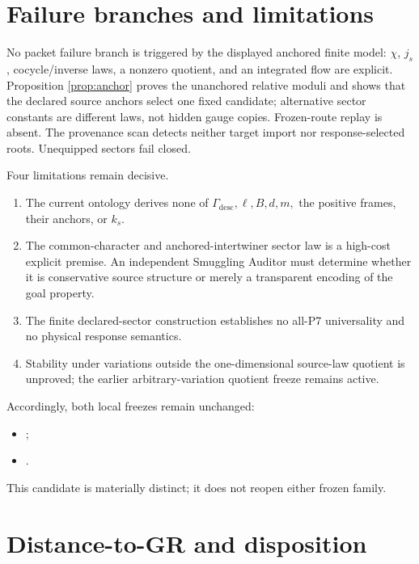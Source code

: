 \documentclass[11pt]{article}
\begin{document}
\section{Failure branches and limitations}

No packet failure branch is triggered by the displayed anchored finite model:
$\chi$, $j_s$, cocycle/inverse laws, a nonzero quotient, and an integrated flow
are explicit.  Proposition \ref{prop:anchor} proves the unanchored relative
moduli and shows that the declared source anchors select one fixed candidate;
alternative sector constants are different laws, not hidden gauge copies.
Frozen-route replay is absent.  The provenance scan detects neither target
import nor response-selected roots.  Unequipped sectors fail closed.

Four limitations remain decisive.

\begin{enumerate}
\item The current ontology derives none of $\Gamma_{\mathrm{desc}},\ell,B,d,m,$
      the positive frames, their anchors, or $k_s$.
\item The common-character and anchored-intertwiner sector law is a high-cost
      explicit premise.  An
      independent Smuggling Auditor must determine whether it is conservative
      source structure or merely a transparent encoding of the goal property.
\item The finite declared-sector construction establishes no all-P7
      universality and no physical response semantics.
\item Stability under variations outside the one-dimensional source-law
      quotient is unproved; the earlier arbitrary-variation quotient freeze
      remains active.
\end{enumerate}

Accordingly, both local freezes remain unchanged:
\begin{itemize}
\item \small{};
\item \small{}.
\end{itemize}
This candidate is materially distinct; it does not reopen either frozen family.

\section{Distance-to-GR and disposition}
\end{document}
